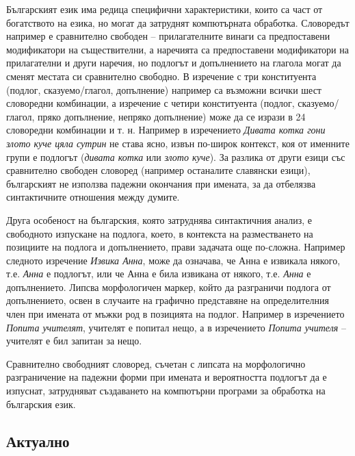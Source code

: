 \begin{multicols}{2}
  Българският език има редица специфични характеристики, които са част от богатството на езика, но могат
   да затруднят компютърната обработка. Словоредът например е
   сравнително свободен – прилагателните винаги са
   предпоставени модификатори на съществителни, а
   наречията
   са предпоставени
   модификатори
   на
   прилагателни и други наречия, но подлогът и
   допълнението на глагола могат да сменят местата си
   сравнително свободно. В изречение с три конституента
   (подлог, сказуемо/глагол, допълнение) например са
   възможни всички шест словоредни комбинации, а
   изречение
   с четири
   конституента
   (подлог,
   сказуемо/глагол,
   пряко допълнение,
   непряко
   допълнение) може да се изрази в 24 словоредни
   комбинации и т. н. Например в изречението \textit{Дивата
   котка гони злото куче цяла сутрин} не става ясно, извън
   по-широк контекст, коя от именните групи е подлогът
   (\textit{дивата котка} или  \textit{злото куче}). За разлика от други езици
   със сравнително свободен
   словоред
   (например
   останалите славянски езици), българският не използва
   падежни окончания при имената, за да отбелязва
   синтактичните отношения между думите.

  Друга особеност на българския, която затруднява синтактичния анализ, е свободното изпускане на подлога, което, в контекста на разместването на позициите на подлога и допълнението, прави задачата
   още по-сложна. Например следното
   изречение \textit{Извика Анна}, може да означава, че
   Анна е извикала някого, т.е.  \textit{Анна} е подлогът, или че
   Анна е била извикана от някого, т.е.  \textit{Анна} е
   допълнението. Липсва морфологичен маркер, който да
   разграничи подлога от допълнението, освен в случаите
   на графично представяне на определителния член при имената от мъжки род в позицията на подлог. Например
   в изречението \textit{Попита учителят}, учителят е попитал
   нещо, а в изречението \textit{Попита учителя} – учителят е бил
   запитан за нещо.

  Сравнително свободният словоред, съчетан с липсата на
   морфологично разграничение на падежни форми при
   имената и вероятността подлогът да е изпуснат, затрудняват създаването на компютърни програми за обработка на българския език.

  \subsection{Актуално}


\end{multicols}
